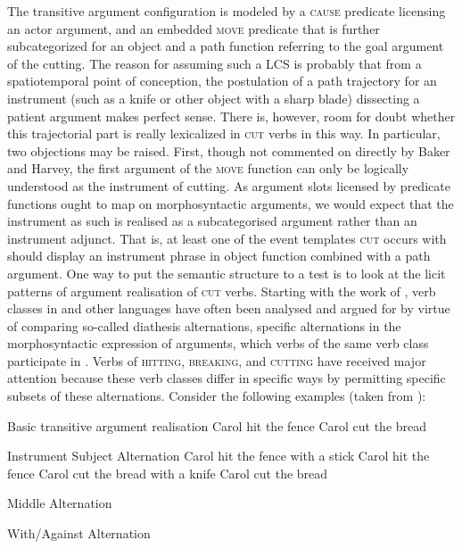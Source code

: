 The transitive argument configuration is modeled by a \textsc{cause} predicate licensing an actor argument, and an embedded \textsc{move} predicate that is further subcategorized for an object and a path function referring to the goal argument of the cutting. The reason for assuming such a LCS is probably that from a spatiotemporal point of conception, the postulation of a path trajectory for an instrument (such as a knife or other object with a sharp blade) dissecting a patient argument makes perfect sense. There is, however, room for doubt whether this trajectorial part is really lexicalized in \textsc{cut} verbs in this way. In particular, two objections may be raised. First, though not commented on directly by Baker and Harvey, the first argument of the \textsc{move} function can only be logically understood as the instrument of cutting. As argument slots licensed by predicate functions ought to map on morphosyntactic arguments, we would expect that the instrument as such is realised as a subcategorised argument rather than an instrument adjunct. That is, at least one of the event templates \textsc{cut} occurs with should display an instrument phrase in object function combined with a path argument. One way to put the semantic structure to a test is to look at the licit patterns of argument realisation of \textsc{cut} verbs. Starting with the work of \citet{Fillmore1970}, verb classes in  and other languages have often been analysed and argued for by virtue of comparing so-called diathesis alternations, specific alternations in the morphosyntactic expression of arguments, which verbs of the same verb class participate in \citep{Levin1993}. Verbs of \textsc{hitting}, \textsc{breaking}, and \textsc{cutting} have received major attention because these verb classes differ in specific ways by permitting specific subsets of these alternations. Consider the following examples (taken from \citealt[148f. and 156]{Levin1993}):

\ea Basic transitive argument realisation \label{alt01}
\ea Carol hit the fence
\ex Carol cut the bread
\z
\z

\ea Instrument Subject Alternation \label{alt02}
\ea Carol hit the fence with a stick
\ex Carol hit the fence
\ex Carol cut the bread with a knife
\ex Carol cut the bread
\z
\z

\ea Middle Alternation \label{alt03}
\z
\z

\ea With/Against Alternation \label{alt04}
\z
\z

